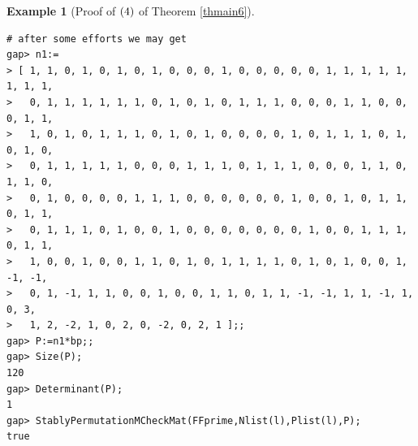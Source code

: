 \documentclass{amsart}
\theoremstyle{plain}
\theoremstyle{definition}
\newtheorem{example}[theorem]{Example}
\theoremstyle{remark}
\begin{document}
{\begin{example}[{Proof of ${\rm (4)}$ of {Theorem \ref{thmain6}}}]
\begin{verbatim}
# after some efforts we may get 
gap> n1:=
> [ 1, 1, 0, 1, 0, 1, 0, 1, 0, 0, 0, 1, 0, 0, 0, 0, 0, 1, 1, 1, 1, 1, 1, 1, 1, 
>   0, 1, 1, 1, 1, 1, 1, 0, 1, 0, 1, 0, 1, 1, 1, 0, 0, 0, 1, 1, 0, 0, 0, 1, 1, 
>   1, 0, 1, 0, 1, 1, 1, 0, 1, 0, 1, 0, 0, 0, 0, 1, 0, 1, 1, 1, 0, 1, 0, 1, 0, 
>   0, 1, 1, 1, 1, 1, 0, 0, 0, 1, 1, 1, 0, 1, 1, 1, 0, 0, 0, 1, 1, 0, 1, 1, 0, 
>   0, 1, 0, 0, 0, 0, 1, 1, 1, 0, 0, 0, 0, 0, 0, 1, 0, 0, 1, 0, 1, 1, 0, 1, 1, 
>   0, 1, 1, 1, 0, 1, 0, 0, 1, 0, 0, 0, 0, 0, 0, 0, 1, 0, 0, 1, 1, 1, 0, 1, 1, 
>   1, 0, 0, 1, 0, 0, 1, 1, 0, 1, 0, 1, 1, 1, 1, 0, 1, 0, 1, 0, 0, 1, -1, -1, 
>   0, 1, -1, 1, 1, 0, 0, 1, 0, 0, 1, 1, 0, 1, 1, -1, -1, 1, 1, -1, 1, 0, 3, 
>   1, 2, -2, 1, 0, 2, 0, -2, 0, 2, 1 ];;
gap> P:=n1*bp;;
gap> Size(P);
120
gap> Determinant(P);
1
gap> StablyPermutationMCheckMat(FFprime,Nlist(l),Plist(l),P);
true
\end{verbatim}
\end{example}

}
\end{document}
